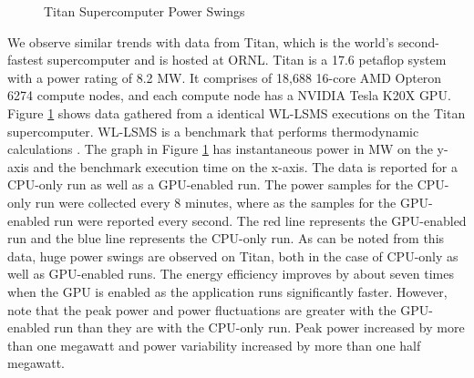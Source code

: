 \begin{figure}
\begin{center}
\caption{Titan Supercomputer Power Swings}
\label{fig:titan}
\end{center}
\end{figure}

We observe similar trends with data from Titan, which is the world's second-fastest supercomputer and is hosted at ORNL. Titan is a 17.6 petaflop system with a power rating of 8.2 MW. It comprises of 18,688 16-core AMD Opteron 6274 compute nodes, and each compute node has a NVIDIA Tesla K20X GPU. Figure \ref{fig:titan} shows data gathered from a identical WL-LSMS executions on the Titan supercomputer. WL-LSMS is a benchmark that performs thermodynamic calculations  \cite{WLLSMS}. The graph in Figure \ref{fig:titan} has instantaneous power in MW on the y-axis and the benchmark execution time on the x-axis. The data is reported for a CPU-only run as well as a GPU-enabled run. The power samples for the CPU-only run were collected every 8 minutes, where as the samples for the GPU-enabled run were reported every second. The red line represents the GPU-enabled run and the blue line represents the CPU-only run.  As can be noted from this data, huge power swings are observed on Titan, both in the case of CPU-only as well as GPU-enabled runs. 
The energy efficiency improves by about seven times when the GPU is enabled as the application runs significantly faster. However, note that the peak power and power fluctuations are greater with the GPU-enabled run than they are with the CPU-only run.  Peak power increased by more than one megawatt and power variability increased by more than one half megawatt. 

